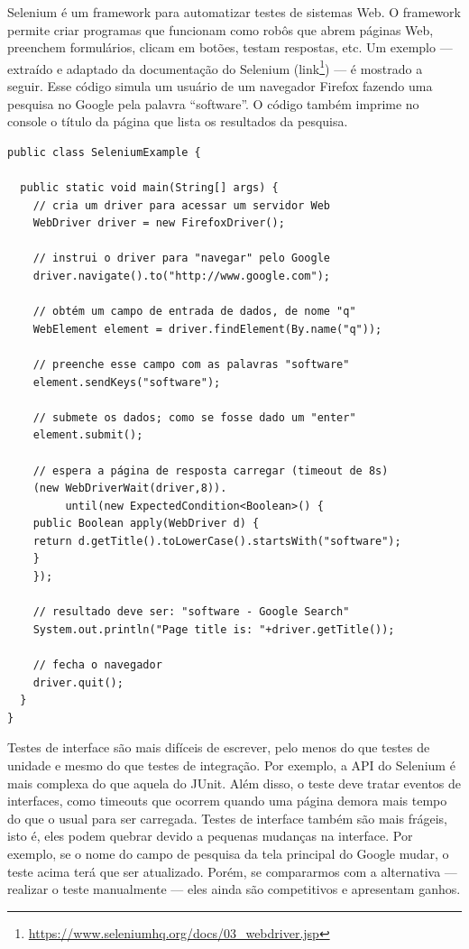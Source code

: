 \documentclass[
  11pt,
  twoside]{book}
\DeclareRobustCommand{\href}[2]{#2\footnote{\url{#1}}}
\begin{document}
 

Selenium é um framework para automatizar testes de sistemas Web. O
framework permite criar programas que funcionam como robôs que abrem
páginas Web, preenchem formulários, clicam em botões, testam respostas,
etc. Um exemplo --- extraído e adaptado da documentação do Selenium
(\href{https://www.seleniumhq.org/docs/03_webdriver.jsp}{link}) --- é
mostrado a seguir. Esse código simula um usuário de um navegador Firefox
fazendo uma pesquisa no Google pela palavra ``software''. O código
também imprime no console o título da página que lista os resultados da
pesquisa.

\begin{lstlisting}
public class SeleniumExample {

  public static void main(String[] args) {
    // cria um driver para acessar um servidor Web
    WebDriver driver = new FirefoxDriver();

    // instrui o driver para "navegar" pelo Google
    driver.navigate().to("http://www.google.com");

    // obtém um campo de entrada de dados, de nome "q"
    WebElement element = driver.findElement(By.name("q"));

    // preenche esse campo com as palavras "software"
    element.sendKeys("software");

    // submete os dados; como se fosse dado um "enter"
    element.submit();

    // espera a página de resposta carregar (timeout de 8s)
    (new WebDriverWait(driver,8)).
         until(new ExpectedCondition<Boolean>() {
    public Boolean apply(WebDriver d) {
    return d.getTitle().toLowerCase().startsWith("software");
    }
    });

    // resultado deve ser: "software - Google Search"
    System.out.println("Page title is: "+driver.getTitle());

    // fecha o navegador
    driver.quit();
  }
}
\end{lstlisting}

Testes de interface são mais difíceis de escrever, pelo menos do que
testes de unidade e mesmo do que testes de integração. Por exemplo, a
API do Selenium é mais complexa do que aquela do JUnit. Além disso, o
teste deve tratar eventos de interfaces, como timeouts que ocorrem
quando uma página demora mais tempo do que o usual para ser carregada.
Testes de interface também são mais frágeis, isto é, eles podem quebrar
devido a pequenas mudanças na interface. Por exemplo, se o nome do campo
de pesquisa da tela principal do Google mudar, o teste acima terá que
ser atualizado. Porém, se compararmos com a alternativa --- realizar o
teste manualmente --- eles ainda são competitivos e apresentam ganhos.
\end{document}
